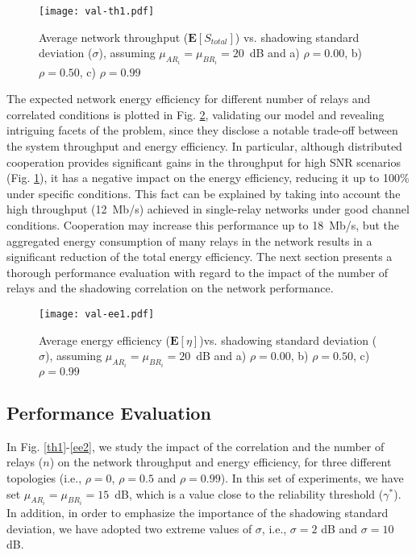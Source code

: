 \documentclass[12pt,draftcls, onecolumn]{IEEEtran}
\begin{document}
\begin{figure}[htb]
\centering
\texttt{[image: val-th1.pdf]}
\caption{Average network throughput ($\mathbf{E}[S_{total}]$) vs. shadowing standard deviation ($\sigma$), assuming $\mu_{AR_i}=\mu_{BR_i}=20$~dB and a) $\rho=0.00$, b) $\rho=0.50$, c) $\rho=0.99$} \label{val1}
\end{figure}

The expected network energy efficiency for different number of relays and correlated conditions is plotted in Fig. \ref{val2}, validating our model and revealing intriguing facets of the problem, since they disclose a notable trade-off between the system throughput and energy efficiency. In particular, although distributed cooperation provides significant gains in the throughput for high SNR scenarios (Fig. \ref{val1}), it has a negative impact on the energy efficiency, reducing it up to 100\% under specific conditions. This fact can be explained by taking into account the high throughput (12~Mb/s) achieved in single-relay networks under good channel conditions. Cooperation may increase this performance up to 18~Mb/s, but the aggregated energy consumption of many relays in the network results in a significant reduction of the total energy efficiency. The next section presents a thorough performance evaluation with regard to the impact of the number of relays and the shadowing correlation on the network performance.

\begin{figure}[htb]
\centering
\texttt{[image: val-ee1.pdf]}
\caption{Average energy efficiency ($\mathbf{E}[\eta]$)vs. shadowing standard deviation ($\sigma$), assuming $\mu_{AR_i}=\mu_{BR_i}=20$~dB and a) $\rho=0.00$, b) $\rho=0.50$, c) $\rho=0.99$} \label{val2}
\end{figure}

\subsection{Performance Evaluation}

In Fig. \ref{th1}-\ref{ee2}, we study the impact of the correlation and the number of relays ($n$) on the network throughput and energy efficiency, for three different topologies (i.e., $\rho=0$, $\rho=0.5$ and $\rho=0.99$). In this set of experiments, we have set $\mu_{AR_i}=\mu_{BR_i}=15$~dB, which is a value close to the reliability threshold ($\gamma^*$). In addition, in order to emphasize the importance of the shadowing standard deviation, we have adopted two extreme values of $\sigma$, i.e., $\sigma=2$ dB and $\sigma=10$ dB.
\end{document}
